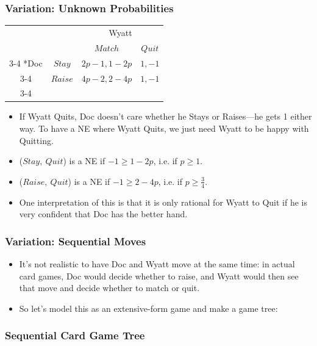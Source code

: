 \begin{frame}
\frametitle{Variation: Unknown Probabilities}
\begin{table}[h]
\centering
\begin{tabular}{cc|c|c|}
& \multicolumn{1}{c}{} & \multicolumn{2}{c}{Wyatt}\\
& \multicolumn{1}{c}{} & \multicolumn{1}{c}{$Match$}  & \multicolumn{1}{c}{$Quit$} \\\cline{3-4}
\multirow{2}*{Doc}  & $Stay$ & $2p - 1, 1 - 2p$ & $1, -1$ \\\cline{3-4}
& $Raise$ & $4p - 2, 2 - 4p$ & $1,-1$ \\\cline{3-4}
\end{tabular}
\end{table}
\begin{itemize}
\item If Wyatt Quits, Doc doesn't care whether he Stays or Raises---he gets 1 either way. To have a NE where Wyatt Quits, we just need Wyatt to be happy with Quitting.
\item ($Stay,~Quit$) is a NE if $-1 \geq 1 - 2p$, i.e. if $p \geq 1$.
\item ($Raise,~Quit$) is a NE if $-1 \geq 2 - 4p$, i.e. if $p \geq \frac{3}{4}$.
\item One interpretation of this is that it is only rational for Wyatt to Quit if he is very confident that Doc has the better hand.
\end{itemize}
\end{frame}


\begin{frame}
\frametitle{Variation: Sequential Moves}
\begin{itemize}
\item It's not realistic to have Doc and Wyatt move at the same time: in actual card games, Doc would decide whether to raise, and Wyatt would then see that move and decide whether to match or quit.
\item So let's model this as an extensive-form game and make a game tree:
\end{itemize}
\end{frame}

\begin{frame}
\frametitle{Sequential Card Game Tree}
\end{frame}

